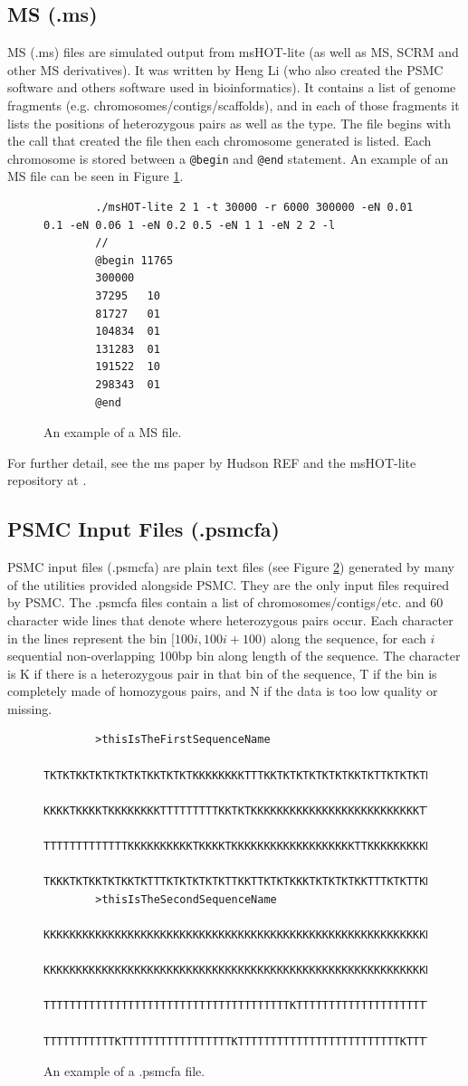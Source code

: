\documentclass[11pt,a4paper]{article}
\begin{document}
\subsection{MS (.ms)}\label{sec:ms}
	MS (.ms) files are simulated output from msHOT-lite (as well as MS, SCRM and other MS derivatives). It was written by Heng Li (who also created the PSMC software and others software used in bioinformatics). It contains a list of genome fragments (e.g. chromosomes/contigs/scaffolds), and in each of those fragments it lists the positions of heterozygous pairs as well as the type. The file begins with the call that created the file then each chromosome generated is listed. Each chromosome is stored between a \verb|@begin| and \verb|@end| statement. An example of an MS file can be seen in Figure \ref{msFile}.
	\begin{figure}[h]
		\begin{lstlisting}
		./msHOT-lite 2 1 -t 30000 -r 6000 300000 -eN 0.01 0.1 -eN 0.06 1 -eN 0.2 0.5 -eN 1 1 -eN 2 2 -l 
		//
		@begin 11765
		300000
		37295	10
		81727	01
		104834	01
		131283	01
		191522	10
		298343	01
		@end
		\end{lstlisting}
		\caption{An example of a MS file.}
		\label{msFile}
	\end{figure}
For further detail, see the ms paper by Hudson REF and the msHOT-lite repository at \url{}.

\subsection{PSMC Input Files (.psmcfa)}\label{sec:psmcfa}
PSMC input files (.psmcfa) are plain text files (see Figure \ref{psmcfa}) generated by many of the utilities provided alongside PSMC. They are the only input files required by PSMC. The .psmcfa files contain a list of chromosomes/contigs/etc. and 60 character wide lines that denote where heterozygous pairs occur. Each character in the lines represent the bin  $[100i,100i+100)$ along the sequence, for each $i$ sequential non-overlapping 100bp bin along length of the sequence. The character is K if there is a heterozygous pair in that bin of the sequence, T if the bin is completely made of homozygous pairs, and N if the data is too low quality or missing.
	\begin{figure}[h]
		\begin{lstlisting}
		>thisIsTheFirstSequenceName
		TKTKTKKTKTKTKTKTKKTKTKTKKKKKKKKTTTKKTKTKTKTKTKTKKTKTTKTKTKTK
		KKKKTKKKKTKKKKKKKKTTTTTTTTTKKTKTKKKKKKKKKKKKKKKKKKKKKKKKKKTT
		TTTTTTTTTTTTTKKKKKKKKKKTKKKKTKKKKKKKKKKKKKKKKKKKTTKKKKKKKKKK
		TKKKTKTKKTKTKKTKTTTKTKTKTKTKTTKKTTKTKTKKKTKTKTKTKKTTTKTKTTKK
		>thisIsTheSecondSequenceName
		KKKKKKKKKKKKKKKKKKKKKKKKKKKKKKKKKKKKKKKKKKKKKKKKKKKKKKKKKKKK
		KKKKKKKKKKKKKKKKKKKKKKKKKKKKKKKKKKKKKKKKKKKKKKKKKKKKKKKKKKKK
		TTTTTTTTTTTTTTTTTTTTTTTTTTTTTTTTTTTTTTKTTTTTTTTTTTTTTTTTTTTT
		TTTTTTTTTTTKTTTTTTTTTTTTTTTTTKTTTTTTTTTTTTTTTTTTTTTTTTTKTTTT
		\end{lstlisting}
		\caption{An example of a .psmcfa file.}\label{psmcfa}
	\end{figure}
	
\end{document}
